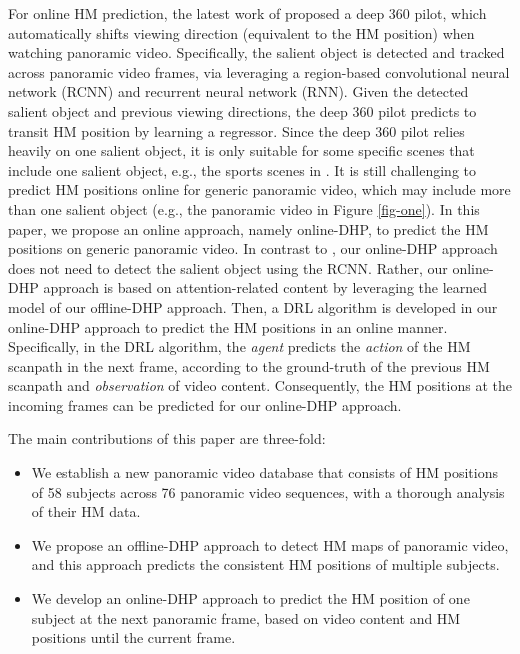 \documentclass[10pt,journal,compsoc]{IEEEtran}
\begin{document}
For online HM prediction, the latest work of \cite{hu2017deep} proposed a deep 360 pilot, which automatically shifts viewing direction (equivalent to the HM position) when watching panoramic video. Specifically, the salient object is detected and tracked across panoramic video frames, via leveraging a region-based convolutional neural network (RCNN) \cite{ren2015faster} and recurrent neural network (RNN). Given the detected salient object and previous viewing directions, the deep 360 pilot predicts to transit HM position by learning a regressor. Since the deep 360 pilot relies heavily on one salient object, it is only suitable for some specific scenes that include one salient object, e.g., the sports scenes in \cite{hu2017deep}. It is still challenging to predict HM positions online for generic panoramic video, which may include more than one salient object (e.g., the panoramic video in Figure \ref{fig-one}). In this paper, we propose an online approach, namely online-DHP, to predict the HM positions on generic panoramic video. In contrast to \cite{hu2017deep}, our online-DHP approach does not need to detect the salient object using the RCNN. Rather, our online-DHP approach is based on attention-related content by leveraging the learned model of our offline-DHP approach. Then, a DRL algorithm is developed in our online-DHP approach to predict the HM positions in an online manner. Specifically, in the DRL algorithm, the \textit{agent} predicts the \textit{action} of the HM scanpath in the next frame, according to the ground-truth of the previous HM scanpath and \textit{observation} of video content. Consequently, the HM positions at the incoming frames can be predicted for our online-DHP approach.


The main contributions of this paper are three-fold:
\begin{itemize}
\item We establish a new panoramic video database that consists of HM positions of 58 subjects  across 76 panoramic video sequences, with a thorough analysis of their HM data.

\item We propose an offline-DHP approach to detect HM maps of panoramic video, and this approach predicts the consistent HM positions of multiple subjects.

\item We develop an online-DHP approach to predict the HM position of one subject at the next panoramic frame, based on video content and HM positions until the current frame.

\end{itemize}
\end{document}
